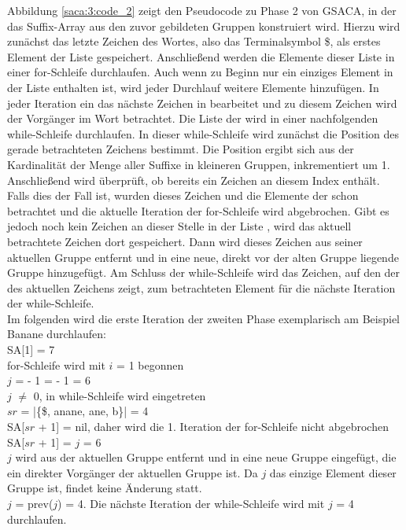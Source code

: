 Abbildung \ref{saca:3:code_2} zeigt den Pseudocode zu Phase 2 von GSACA, in der das Suffix-Array aus den zuvor gebildeten Gruppen konstruiert wird.
Hierzu wird zunächst das letzte Zeichen des Wortes, also das Terminalsymbol \$, als erstes Element der Liste \sa gespeichert. 
Anschließend werden die Elemente dieser Liste in einer for-Schleife durchlaufen.
Auch wenn zu Beginn nur ein einziges Element in der Liste enthalten ist, wird jeder Durchlauf weitere Elemente hinzufügen.
In jeder Iteration ein das nächste Zeichen in \sa bearbeitet und zu diesem Zeichen wird der Vorgänger im Wort betrachtet. 
Die Liste der \prevpointer wird in einer nachfolgenden while-Schleife durchlaufen.
In dieser while-Schleife wird zunächst die Position des gerade betrachteten Zeichens bestimmt. 
Die Position ergibt sich aus der Kardinalität der Menge aller Suffixe in kleineren Gruppen, inkrementiert um 1. 
Anschließend wird überprüft, ob \sa bereits ein Zeichen an diesem Index enthält. 
Falls dies der Fall ist, wurden dieses Zeichen und die Elemente der \prevpointer schon betrachtet und die aktuelle Iteration der for-Schleife wird abgebrochen. 
Gibt es jedoch noch kein Zeichen an dieser Stelle in der Liste \sa, wird das aktuell betrachtete Zeichen dort gespeichert. 
Dann wird dieses Zeichen aus seiner aktuellen Gruppe entfernt und in eine neue, direkt vor der alten Gruppe liegende Gruppe hinzugefügt.
Am Schluss der while-Schleife wird das Zeichen, auf den der \prevpointer des aktuellen Zeichens zeigt, zum betrachteten Element für die nächste Iteration der while-Schleife.\\

Im folgenden wird die erste Iteration der zweiten Phase exemplarisch am Beispiel Banane durchlaufen:\\
SA[1] = 7\\
for-Schleife wird mit $i$ = 1 begonnen\\
$j$ = \sa[$i$] - 1 = \sa[1] - 1 = 6\\
$j$ $\neq$ 0, in while-Schleife wird eingetreten\\
$sr$ = |\{\$, anane, ane, b\}| = 4\\
SA[$sr$ + 1] = nil, daher wird die 1. Iteration der for-Schleife nicht abgebrochen\\
SA[$sr$ + 1] = $j$ = 6\\
$j$ wird aus der aktuellen Gruppe entfernt und in eine neue Gruppe eingefügt, die ein direkter Vorgänger der aktuellen Gruppe ist. Da $j$ das einzige Element dieser Gruppe ist, findet keine Änderung statt.\\
$j$ = prev($j$) = 4. Die nächste Iteration der while-Schleife wird mit $j$ = 4 durchlaufen.


\clearpage %

